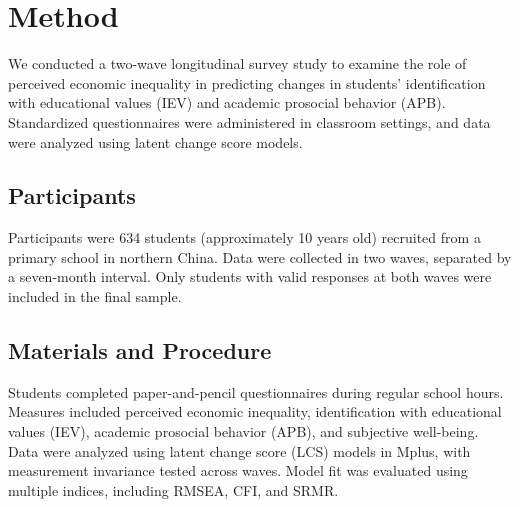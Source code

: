 \section{Method}

We conducted a two-wave longitudinal survey study to examine the role of perceived economic inequality in predicting changes in students’ identification with educational values (IEV) and academic prosocial behavior (APB). Standardized questionnaires were administered in classroom settings, and data were analyzed using latent change score models.

\subsection{Participants}
Participants were 634 students (approximately 10 years old) recruited from a primary school in northern China. Data were collected in two waves, separated by a seven-month interval. Only students with valid responses at both waves were included in the final sample.

\subsection{Materials and Procedure}
Students completed paper-and-pencil questionnaires during regular school hours. Measures included perceived economic inequality, identification with educational values (IEV), academic prosocial behavior (APB), and subjective well-being. Data were analyzed using latent change score (LCS) models in Mplus, with measurement invariance tested across waves. Model fit was evaluated using multiple indices, including RMSEA, CFI, and SRMR.